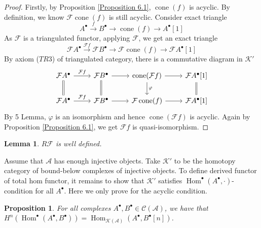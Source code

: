 \documentclass{ctexart}
\newtheorem{proposition}{Proposition}[section]
\newtheorem{lemma}{Lemma}[section]
\renewcommand{\hom}{\operatorname{Hom}}
\newcommand{\cone}{\operatorname{cone}}
\begin{document}
\begin{proof}
    Firstly, by Proposition \ref{Proposition 6.1}, $\cone(f)$ is acyclic.
    By definition, we know $\mathcal{F}\cone(f)$ is still acyclic.
    Consider exact triangle
    \begin{equation}
        A^{\bullet} \overset{f}{\longrightarrow} B^{\bullet} \longrightarrow \cone(f) \longrightarrow A^{\bullet}[1] 
    \end{equation}
    As $\mathcal{F}$ is a triangulated functor, applying $\mathcal{F}$, we get an exact triangle
    \begin{equation}
        \mathcal{F}A^{\bullet} \overset{\mathcal{F}f}{\longrightarrow} \mathcal{F}B^{\bullet} \longrightarrow \mathcal{F}\cone(f) \longrightarrow \mathcal{F}A^{\bullet}[1] 
    \end{equation}
    By axiom ($TR3$) of triangulated category, there is a commutative diagram in $\mathcal{K}'$
    \begin{equation}
        \begin{tikzcd}
            \mathcal{F}A^{\bullet} \arrow[r, "\mathcal{F}f"] \arrow[d, equal] &
            \mathcal{F}B^{\bullet} \arrow[r] \arrow[d, equal] &
            \cone(\mathcal{F}f) \arrow[r] \arrow[d, "\varphi"] &
            \mathcal{F}A^{\bullet}[1] \arrow[d, equal] \\
            \mathcal{F}A^{\bullet} \arrow[r, "\mathcal{F}f"] &
            \mathcal{F}B^{\bullet} \arrow[r] &
            \mathcal{F}\cone(f) \arrow[r] &
            \mathcal{F}A^{\bullet}[1]
        \end{tikzcd}
    \end{equation}
    By 5 Lemma, $\varphi$ is an isomorphism and hence $\cone(\mathcal{F}f)$ is acyclic.
    Again by Proposition \ref{Proposition 6.1}, we get $\mathcal{F}f$ is quasi-isomorphism.
\end{proof}
\begin{lemma}
    $R\mathcal{F}$ is well defined.
    \label{Lemma 6.14}
\end{lemma}
Assume that $\mathscr{A}$ has enough injective objects.
Take $\mathcal{K}'$ to be the homotopy category of bound-below complexes of injective objects.
To define derived functor of total hom functor,
it remains to show that $\mathcal{K}'$ satisfies $\hom^{\bullet}(A^{\bullet}, \cdot)$-condition for all $A^{\bullet}$.
Here we only prove for the acyclic condition.
\begin{proposition}
    For all complexes $A^{\bullet},B^{\bullet}\in \mathcal{C}(\mathscr{A})$,
    we have that $H^{n}(\hom^{\bullet}(A^{\bullet}, B^{\bullet})) = \hom_{\mathcal{K}(\mathscr{A})}(A^{\bullet}, B^{\bullet}[n])$. 
    \label{Proposition 6.3}
\end{proposition}
\end{document}

